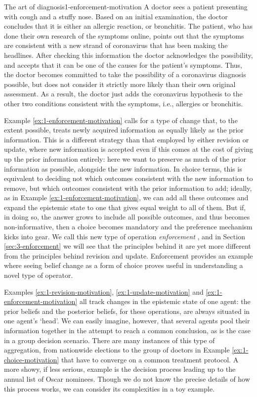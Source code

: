 \begin{xmpl}{The art of diagnosis}{1-enforcement-motivation}
	A doctor sees a patient presenting 
	with cough and a stuffy nose.
	Based on an initial examination, 
	the doctor concludes that it is either 
	an allergic reaction, or bronchitis. 
	The patient, who has done their own 
	research of the symptoms online, points 
	out that the symptoms are consistent 
	with a new strand of coronavirus 
	that has been making the headlines.
	After checking this information
	the doctor acknowledges the possibility, 
	and accepts that it can be one of the 
	causes for the patient's symptoms.
	Thus, the doctor becomes committed to 
	take the possibility of a coronavirus 
	diagnosis possible, but does not consider 
	it strictly more likely 
	than their own original assessment. 
	As a result, the doctor just adds
	the coronavirus hypothesis to the other two 
	conditions consistent with the symptoms,
	i.e., allergies or bronchitis.
\end{xmpl}

Example \ref{ex:1-enforcement-motivation} calls 
for a type of change that,
to the extent possible, treats
newly acquired information  
as equally likely as the prior information.
This is a different strategy than that 
employed by either revision or update,
where new information is accepted
even if this comes at the cost of giving 
up the prior information entirely:
here we want to preserve as much of the 
prior information as possible,
alongside the new information.
In choice terms, this is equivalent to 
deciding not which outcomes consistent
with the new information to remove,
but which outcomes consistent 
with the prior information to add;
ideally, as in Example \ref{ex:1-enforcement-motivation},
we can add all these outcomes
and expand the epistemic state 
to one that gives equal weight to all of them.
But if, in doing so, the answer 
grows to include all possible outcomes,
and thus becomes non-informative,
then a choice becomes mandatory
and the preference mechanism kicks into gear. 
We call this new type of 
operation \emph{enforcement} \cite{HaretWW18}, 
and in Section \ref{sec:3-enforcement}
we will see that the principles behind it 
are yet more different from the principles 
behind revision and update. 
Enforcement provides an example where seeing belief change 
as a form of choice proves useful in understanding 
a novel type of operator.

Examples \ref{ex:1-revision-motivation}, 
\ref{ex:1-update-motivation} and \ref{ex:1-enforcement-motivation}
all track changes in the epistemic state of one agent:
the prior beliefs and the posterior beliefs, 
for these operations, are always situated in one agent's `head'.
We can easily imagine, however, that several agents pool
their information together in the attempt to reach a common conclusion,
as is the case in a group decision scenario.
There are many instances of this type of aggregation,
from nationwide elections to the group 
of doctors in Example \ref{ex:1-choice-motivation}
that have to converge on a common treatment protocol.
A more showy, if less serious, example is the decision process
leading up to the annual list of Oscar nominees.
Though we do not know the precise details of how this process works, 
we can consider its complexities in a toy example.

